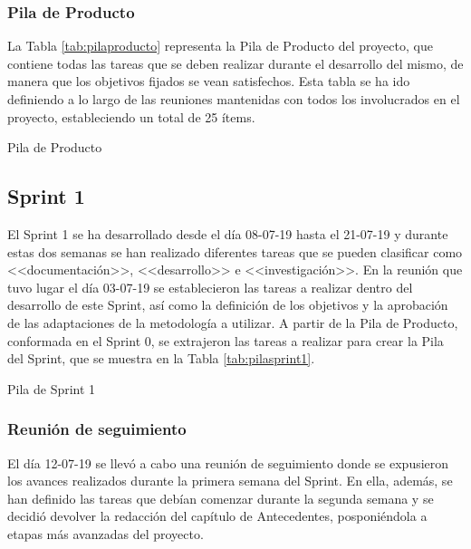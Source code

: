 \subsubsection{Pila de Producto}
La Tabla \ref{tab:pilaproducto} representa la Pila de Producto del proyecto, que contiene todas las tareas que se deben realizar durante el desarrollo del mismo, de manera que los objetivos fijados se vean satisfechos. Esta tabla se ha ido definiendo a lo largo de las reuniones mantenidas con todos los involucrados en el proyecto, estableciendo un total de 25 ítems.

\begin{table}[!htbp]
	\centering
	{\small
		
	}
	\caption[Pila de Producto]
	{Pila de Producto}
	\label{tab:pilaproducto}
\end{table}

\clearpage

\subsection{Sprint 1}
El Sprint 1 se ha desarrollado desde el día 08-07-19 hasta el 21-07-19 y durante estas dos semanas se han realizado diferentes tareas que se pueden clasificar como <<documentación>>, <<desarrollo>> e <<investigación>>. En la reunión que tuvo lugar el día 03-07-19 se establecieron las tareas a realizar dentro del desarrollo de este Sprint, así como la definición de los objetivos y la aprobación de las adaptaciones de la metodología a utilizar. A partir de la Pila de Producto, conformada en el Sprint 0, se extrajeron las tareas a realizar para crear la Pila del Sprint, que se muestra en la Tabla \ref{tab:pilasprint1}.

\begin{table}[!htbp]
	\centering
	{\small
		
	}
	\caption[Pila de Sprint 1]
	{Pila de Sprint 1}
	\label{tab:pilasprint1}
\end{table}

\subsubsection{Reunión de seguimiento}
El día 12-07-19 se llevó a cabo una reunión de seguimiento donde se expusieron los avances realizados durante la primera semana del Sprint. En ella, además, se han definido las tareas que debían comenzar durante la segunda semana y se decidió devolver la redacción del capítulo de Antecedentes, posponiéndola a etapas más avanzadas del proyecto.

